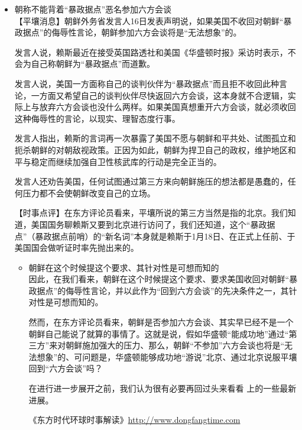 \documentclass[a4paper,11pt]{article}
\begin{document}
  
\begin{itemize}

\item 朝称不能背着“暴政据点”恶名参加六方会谈\\
\label{sec-4_1}%
【平壤消息】朝鲜外务省发言人16日发表声明说，如果美国不收回对朝鲜“暴政据点”的侮辱性言论，朝鲜参加六方会谈将是“无法想象”的。

   发言人说，赖斯最近在接受英国路透社和美国《华盛顿时报》采访时表示，不会为自己称朝鲜为“暴政据点”而道歉。

   发言人说，美国一方面称自己的谈判伙伴为“暴政据点”而且拒不收回此种言论，一方面又希望自己的谈判伙伴尽快返回六方会谈，这本身就不合逻辑，实际上与放弃六方会谈也没什么两样。如果美国真想重开六方会谈，就必须收回这种侮辱性的言论，以现实、理智态度行事。

   发言人指出，赖斯的言词再一次暴露了美国不愿与朝鲜和平共处、试图孤立和扼杀朝鲜的对朝敌视政策。正因为如此，朝鲜为捍卫自己的政权，维护地区和平与稳定而继续加强自卫性核武库的行动是完全正当的。

   发言人还劝告美国，任何试图通过第三方来向朝鲜施压的想法都是愚蠢的，任何压力都不会使朝鲜改变自己的立场。


   【时事点评】在东方评论员看来，平壤所说的第三方当然是指的北京。我们知道，美国国务聊赖斯又要到北京进行访问了，我们还知道，这个“暴政据点”（暴政据点前哨）的“新名词”本身就是赖斯于1月18日、在正式上任前、于美国国会做听证时率先抛出来的。
 
\begin{itemize}

\item 朝鲜在这个时候提这个要求、其针对性是可想而知的\\
\label{sec-4_1_1}%
因此，在我们看来，朝鲜在这个时候提这个要求、要求美国收回对朝鲜“暴政据点”的侮辱性言论，并以此作为“回到六方会谈”的先决条件之一，其针对性是可想而知的。
 
   然而，在东方评论员看来，朝鲜是否参加六方会谈、其实早已经不是一个朝鲜自己能说了就算的事情了。这就是说，假如华盛顿“能成功地”通过“第三方”来对朝鲜施加强大的压力、那么，朝鲜“不参加”六方会谈也将是“无法想象”的、可问题是，华盛顿能够成功地“游说”北京、通过北京说服平壤回到“六方会谈”吗？

   在进行进一步展开之前，我们认为很有必要再回过头来看看
   上的一些最新进展。

   《东方时代环球时事解读》\href{http://www.dongfangtime.com}{http://www.dongfangtime.com}

\end{itemize} %


\end{itemize}
\end{document}
